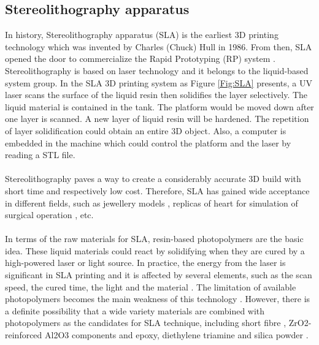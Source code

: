 \subsection{Stereolithography apparatus}

In history, Stereolithography apparatus (SLA) is the earliest 3D printing technology which was invented by Charles (Chuck) Hull in 1986. From then, SLA opened the door to commercialize the Rapid Prototyping (RP) system \cite{zhou2000parametric}. Stereolithography is based on laser technology and it belongs to the liquid-based system group. In the SLA 3D printing system as Figure \ref{Fig:SLA} presents, a UV laser scans the surface of the liquid resin then solidifies the layer selectively. The liquid material is contained in the tank. The platform would be moved down after one layer is scanned. A new layer of liquid resin will be hardened. The repetition of layer solidification could obtain an entire 3D object. Also,  a computer is embedded in the machine which could control the platform and the laser by reading a STL file. \\
\\
Stereolithography paves a way to create a considerably accurate 3D build with short time and respectively low cost. Therefore, SLA has gained wide acceptance in different fields, such as jewellery models \cite{leong1998abrasive} , replicas of heart for simulation of surgical operation \cite{shiraishi2014development}, etc.\\
\\
In terms of the raw materials for SLA, resin-based photopolymers are the basic idea. These liquid materials could react by solidifying when they are cured by a high-powered laser or light source. In practice, the energy from the laser is significant in SLA printing and it is affected by several elements, such as the scan speed, the cured time, the light and the material \cite{chia2015recent}. The limitation of available photopolymers becomes the main weakness of this technology \cite{wang2016stereolithographic}. However, there is a definite possibility that a wide variety materials are combined with photopolymers as the candidates for SLA technique, including short fibre \cite{yunus2017short}, ZrO2-reinforced Al2O3 components \cite{licciulli2005laser} and epoxy, diethylene triamine and silica powder \cite{scarparo1996mechanisms}. 

